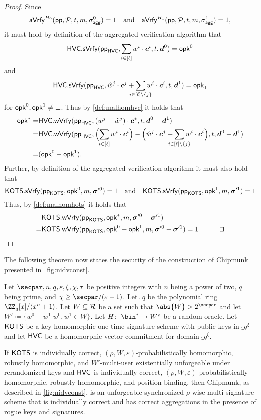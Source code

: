 \begin{proof}
    Since 
    \[
    \mathsf{aVrfy}^{H_0}(\mathsf{pp},\mathcal{P},t,m,\sigma_\mathsf{agg}^0)=1 \quad \text{and} \quad \mathsf{aVrfy}^{H_1}(\mathsf{pp},\mathcal{P},t,m,\sigma_\mathsf{agg}^1)=1,
    \]
    it must hold by definition of the aggregated verification algorithm that 
    \[
      \hvc.\sverify(\hvcparams,\smashoperator{\sum_{i\in[\ell]}} w^i\cdot \vec{c}^i,t,\vec{d}^0) = \opk^0 
    \]
    and
    \[   
      \hvc.\sverify(\hvcparams,\hat{w}^j\cdot \vec{c}^j+\smashoperator{\sum_{i\in[\ell]\setminus\{j\}}} w^i\cdot \vec{c}^i,t,\vec{d}^1)= \opk_1
    \]
    for $\mathsf{opk}^0,\mathsf{opk}^1\neq\bot$.
    Thus by \autoref{def:malhomhvc} it holds that
    \begin{align*}
      \opk^* =& \hvc.\wverify(\hvcparams,(w^j-\hat{w}^j)\cdot \vec{c}^*,t,\vec{d}^0-\vec{d}^1)\\
      =&\hvc.\wverify(\hvcparams,\Bigl(\smashoperator{\sum_{i\in[\ell]}} w^i\cdot \vec{c}^i\Bigr) - \Bigl(\hat{w}^j\cdot \vec{c}^j+\smashoperator{\sum_{i\in[\ell]\setminus\{j\}}} w^i\cdot \vec{c}^i\Bigr),t,\vec{d}^0-\vec{d}^1)\\
       =& (\opk^0-\opk^1).
    \end{align*}
    Further, by definition of the aggregated verification algorithm it must also hold that
    \[
      \mathsf{KOTS}.\mathsf{sVrfy}(\mathsf{pp}_{\mathsf{KOTS}},\mathsf{opk}^0,m,\boldsymbol{\sigma}'^0) =1 \quad \text{and} \quad \mathsf{KOTS}.\mathsf{sVrfy}(\mathsf{pp}_{\mathsf{KOTS}},\mathsf{opk}^1,m,\boldsymbol{\sigma}'^1)=1
    \]
    Thus, by \autoref{def:malhomhots} it holds that
    \begin{align*}
      &\hots.\wverify(\hotsparams,\opk^*,m,\otsig^0-\otsig^1)\\
      =&\hots.\wverify(\hotsparams,\opk^0-\opk^1,m,\otsig^0-\otsig^1)=1 \tag*{\qed}
    \end{align*}
\end{proof}
\fi
The following theorem now states the security of the construction of Chipmunk presented in~\autoref{fig:nidvconst}. 
\begin{theorem}\label{thm:mainconstruction}
Let $\secpar,n,q,\varepsilon,\xi,\chi,\tau$ be positive integers with $n$ being a power of two, $q$ being prime, and $\chi \geq \secpar/(\varepsilon-1)$.
Let $\ring_q$ be the polynomial ring $\ZZ_q[x]/\langle x^n+1\rangle$.
Let $W \subseteq \mathcal{R}$ be a set such that $\abs{W} > 2^\secpar$ and let $W' \coloneqq \{w^0-w^1| w^0,w^1 \in W\}$.
Let $H \colon\; \bin^* \to W^\rho$ be a random oracle.
Let $\mathsf{KOTS}$ be a key homomorphic one-time signature scheme with public keys in $\ring_q^\xi$ and let $\mathsf{HVC}$ be a homomorphic vector commitment for domain $\ring_q^\xi$.

If $\mathsf{KOTS}$ is individually correct, $(\rho,W,\varepsilon)$-probabilistically homomorphic, robustly homomorphic, and $W'$-multi-user existentially unforgeable under rerandomized keys and $\mathsf{HVC}$ is individually correct, $(\rho,W,\varepsilon)$-probabilistically homomorphic, robustly homomorphic, and position-binding, then Chipmunk, as described in \autoref{fig:nidvconst}, is an unforgeable synchronized $\rho$-wise multi-signature scheme that is individually correct and has correct aggregations in the presence of rogue keys and signatures.
\end{theorem}

